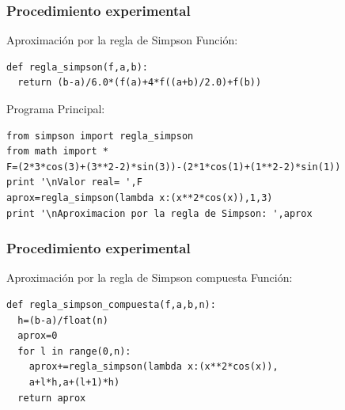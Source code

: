 \documentclass{beamer}
\begin{document}
\begin{frame}[fragile]

  \frametitle{Procedimiento experimental}
  
  \begin{block}{Aproximación por la regla de Simpson}
    Función:
      \begin{center}
        \begin{footnotesize}
          \begin{verbatim}
def regla_simpson(f,a,b):
  return (b-a)/6.0*(f(a)+4*f((a+b)/2.0)+f(b))
          \end{verbatim}
        \end{footnotesize}
      \end{center}
    Programa Principal:
      \begin{center}
        \begin{footnotesize}
          \begin{verbatim}
from simpson import regla_simpson
from math import *
F=(2*3*cos(3)+(3**2-2)*sin(3))-(2*1*cos(1)+(1**2-2)*sin(1))
print '\nValor real= ',F
aprox=regla_simpson(lambda x:(x**2*cos(x)),1,3)
print '\nAproximacion por la regla de Simpson: ',aprox
          \end{verbatim}
        \end{footnotesize}
      \end{center}
  \end{block}
  
\end{frame}
\begin{frame}[fragile]

  \frametitle{Procedimiento experimental}
  
  \begin{block}{Aproximación por la regla de Simpson compuesta}
    Función:
    \begin{center}
      \begin{footnotesize}
        \begin{verbatim}
def regla_simpson_compuesta(f,a,b,n):
  h=(b-a)/float(n)
  aprox=0
  for l in range(0,n):
    aprox+=regla_simpson(lambda x:(x**2*cos(x)),
    a+l*h,a+(l+1)*h)
  return aprox
        \end{verbatim}
      \end{footnotesize}
    \end{center}
  \end{block}
  
\end{frame}
\end{document}
